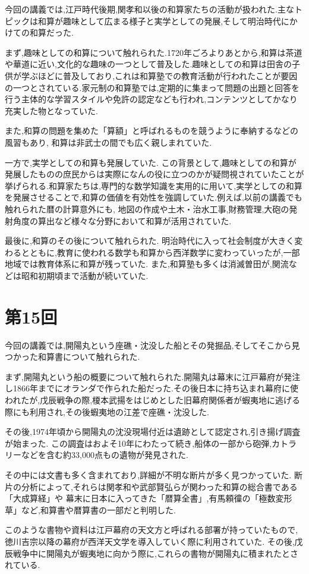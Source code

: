 \documentclass[autodetect-engine, dvi=dvipdfmx, 10pt, a4paper, ja=standard]{bxjsarticle}
\begin{document}
今回の講義では,江戸時代後期,関孝和以後の和算家たちの活動が扱われた.主なトピックは和算が趣味として広まる様子と実学としての発展,そして明治時代にかけての和算だった.

まず,趣味としての和算について触れられた.1720年ごろよりあとから,和算は茶道や華道に近い,文化的な趣味の一つとして普及した.趣味としての和算は田舎の子供が学ぶほどに普及しており,これは和算塾での教育活動が行われたことが要因の一つとされている.家元制の和算塾では,定期的に集まって問題の出題と回答を行う主体的な学習スタイルや免許の認定なども行われ,コンテンツとしてかなり充実した物となっていた.

また,和算の問題を集めた「算額」と呼ばれるものを競うように奉納するなどの風習もあり,
和算は非武士の間でも広く親しまれていた.

一方で,実学としての和算も発展していた.
この背景として,趣味としての和算が発展したものの庶民からは実際になんの役に立つのかが疑問視されていたことが挙げられる.和算家たちは,専門的な数学知識を実用的に用いて,実学としての和算を発展させることで,和算の価値を有効性を強調していた.例えば,以前の講義でも触れられた暦の計算意外にも,
地図の作成や土木・治水工事,財務管理,大砲の発射角度の算出など様々な分野において和算が活用されていた.

最後に,和算のその後について触れられた.
明治時代に入って社会制度が大きく変わるとともに,教育に使われる数学も和算から西洋数学に変わっていったが,一部地域では教育体系に和算が残っていた.
また,和算塾も多くは消滅曽田が,関流などは昭和初期頃まで活動が続いていた.

\section{第15回}

今回の講義では,開陽丸という座礁・沈没した船とその発掘品,そしてそこから見つかった和算書について触れられた.

まず,開陽丸という船の概要について触れられた.開陽丸は幕末に江戸幕府が発注し1866年までにオランダで作られた船だった.その後日本に持ち込まれ幕府に使われたが,戊辰戦争の際,榎本武揚をはじめとした旧幕府関係者が蝦夷地に逃げる際にも利用され,その後蝦夷地の江差で座礁・沈没した.

その後,1974年頃から開陽丸の沈没現場付近は遺跡として認定され,引き揚げ調査が始まった.
この調査はおよそ10年にわたって続き,船体の一部から砲弾,カトラリーなどを含む約33,000点もの遺物が発見された.

その中には文書も多く含まれており,詳細が不明な断片が多く見つかっていた.
断片の分析によって,それらは関孝和や武部賢弘らが関わった和算の総合書である「大成算経」や
幕末に日本に入ってきた「暦算全書」,有馬頼徸の「極数変形草」など,和算書や暦算書の一部だと判明した.

このような書物や資料は江戸幕府の天文方と呼ばれる部署が持っていたもので,
徳川吉宗以降の幕府が西洋天文学を導入していく際に利用されていた.
その後,戊辰戦争中に開陽丸が蝦夷地に向かう際に,これらの書物が開陽丸に積まれたとされている.
\end{document}
